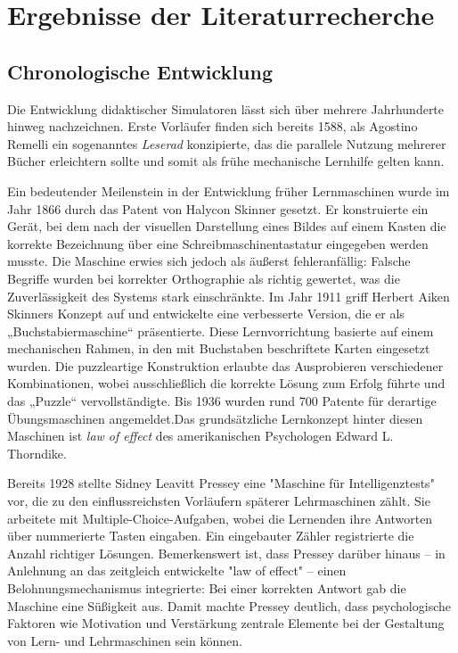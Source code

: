 \chapter{Ergebnisse der Literaturrecherche}

\section{Chronologische Entwicklung}

Die Entwicklung didaktischer Simulatoren lässt sich über mehrere Jahrhunderte hinweg nachzeichnen. Erste Vorläufer finden sich bereits 1588, als Agostino Remelli ein sogenanntes \textit{Leserad} konzipierte, das die parallele Nutzung mehrerer Bücher erleichtern sollte und somit als frühe mechanische Lernhilfe gelten kann.\cite{cayetano_geschichte_2022}

Ein bedeutender Meilenstein in der Entwicklung früher Lernmaschinen wurde im Jahr 1866 durch das Patent von Halycon Skinner gesetzt. Er konstruierte ein Gerät, bei dem nach der visuellen Darstellung eines Bildes auf einem Kasten die korrekte Bezeichnung über eine Schreibmaschinentastatur eingegeben werden musste. Die Maschine erwies sich jedoch als äußerst fehleranfällig: Falsche Begriffe wurden bei korrekter Orthographie als richtig gewertet, was die Zuverlässigkeit des Systems stark einschränkte. Im Jahr 1911 griff Herbert Aiken Skinners Konzept auf und entwickelte eine verbesserte Version, die er als „Buchstabiermaschine“ präsentierte. Diese Lernvorrichtung basierte auf einem mechanischen Rahmen, in den mit Buchstaben beschriftete Karten eingesetzt wurden. Die puzzleartige Konstruktion erlaubte das Ausprobieren verschiedener Kombinationen, wobei ausschließlich die korrekte Lösung zum Erfolg führte und das „Puzzle“ vervollständigte. Bis 1936 wurden rund 700 Patente für derartige Übungsmaschinen angemeldet.Das grundsätzliche Lernkonzept hinter diesen Maschinen ist \textit{law of effect} des amerikanischen Psychologen Edward L. Thorndike. \parencite[S. 3]{niegemann_kompendium_2008}

Bereits 1928 stellte Sidney Leavitt Pressey eine "Maschine für Intelligenztests" vor, die zu den einflussreichsten Vorläufern späterer Lehrmaschinen zählt. Sie arbeitete mit Multiple-Choice-Aufgaben, wobei die Lernenden ihre Antworten über nummerierte Tasten eingaben. Ein eingebauter Zähler registrierte die Anzahl richtiger Lösungen. Bemerkenswert ist, dass Pressey darüber hinaus -- in Anlehnung an das zeitgleich entwickelte "law of effect" -- einen Belohnungsmechanismus integrierte: Bei einer korrekten Antwort gab die Maschine eine Süßigkeit aus. Damit machte Pressey deutlich, dass psychologische Faktoren wie Motivation und Verstärkung zentrale Elemente bei der Gestaltung von Lern- und Lehrmaschinen sein können.\parencite[S. 705]{benjamin_history_1988}\parencite[S. 969f]{skinner_teaching_1958} 

